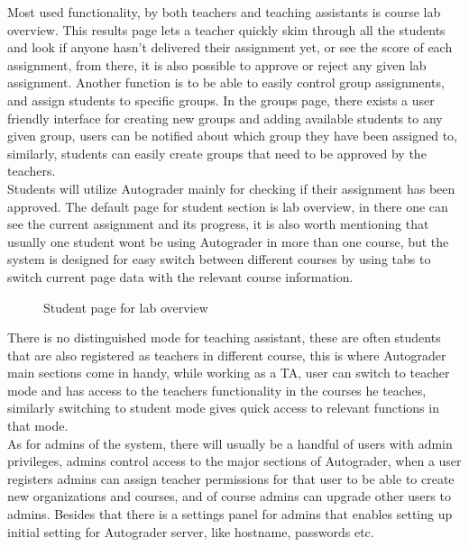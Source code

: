 Most used functionality, by both teachers and teaching assistants is course lab overview. This results page lets a teacher quickly skim through all the students and look if anyone hasn't delivered their assignment yet, or see the score of each assignment, from there, it is also possible to approve or reject any given lab assignment. Another function is to be able to easily control group assignments, and assign students to specific groups. In the groups page, there exists a user friendly interface for creating new groups and adding available students to any given group, users can be notified about which group they have been assigned to, similarly, students can easily create groups that need to be approved by the teachers.
\\Students will utilize Autograder mainly for checking if their assignment has been approved. The default page for student section is lab overview, in there one can see the current assignment and its progress, it is also worth mentioning that usually one student wont be using Autograder in more than one course, but the system is designed for easy switch between different courses by using tabs to switch current page data with the relevant course information.
\begin{figure}[h]
  \caption{Student page for lab overview}
  \label{fig:studentpage}
\end{figure}
There is no distinguished mode for teaching assistant, these are often students that are also registered as teachers in different course, this is where Autograder main sections come in handy, while working as a TA, user can switch to teacher mode and has access to the teachers functionality in the courses he teaches, similarly switching to student mode gives quick access to relevant functions in that mode.
\\As for admins of the system, there will usually be a handful of users with admin privileges, admins control access to the major sections of Autograder, when a user registers admins can assign teacher permissions for that user to be able to create new organizations and courses, and of course admins can upgrade other users to admins. Besides that there is a settings panel for admins that enables setting up initial setting for Autograder server, like hostname, passwords etc.
